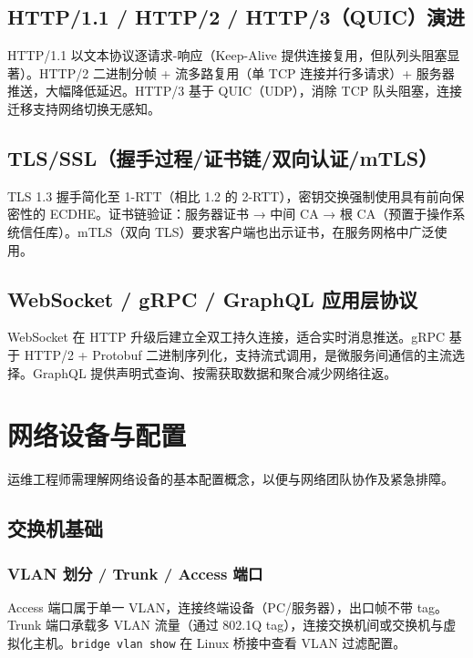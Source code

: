 \documentclass[12pt,UTF8]{ctexbook}
\begin{document}
  \section{HTTP/1.1 / HTTP/2 / HTTP/3（QUIC）演进}

HTTP/1.1 以文本协议逐请求-响应（Keep-Alive 提供连接复用，但队列头阻塞显著）。HTTP/2 二进制分帧 + 流多路复用（单 TCP 连接并行多请求）+ 服务器推送，大幅降低延迟。HTTP/3 基于 QUIC（UDP），消除 TCP 队头阻塞，连接迁移支持网络切换无感知。

  \section{TLS/SSL（握手过程/证书链/双向认证/mTLS）}

TLS 1.3 握手简化至 1-RTT（相比 1.2 的 2-RTT），密钥交换强制使用具有前向保密性的 ECDHE。证书链验证：服务器证书 → 中间 CA → 根 CA（预置于操作系统信任库）。mTLS（双向 TLS）要求客户端也出示证书，在服务网格中广泛使用。

  \section{WebSocket / gRPC / GraphQL 应用层协议}

WebSocket 在 HTTP 升级后建立全双工持久连接，适合实时消息推送。gRPC 基于 HTTP/2 + Protobuf 二进制序列化，支持流式调用，是微服务间通信的主流选择。GraphQL 提供声明式查询、按需获取数据和聚合减少网络往返。

\chapter{网络设备与配置}
\label{chap:network-devices}

运维工程师需理解网络设备的基本配置概念，以便与网络团队协作及紧急排障。

  \section{交换机基础}
    \subsection{VLAN 划分 / Trunk / Access 端口}

Access 端口属于单一 VLAN，连接终端设备（PC/服务器），出口帧不带 tag。Trunk 端口承载多 VLAN 流量（通过 802.1Q tag），连接交换机间或交换机与虚拟化主机。\verb|bridge vlan show| 在 Linux 桥接中查看 VLAN 过滤配置。
\end{document}
